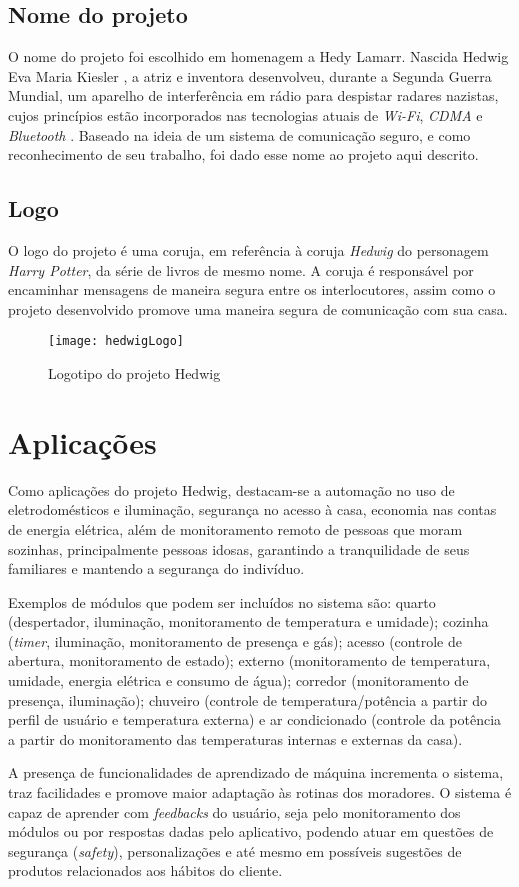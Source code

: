 \subsection{Nome do projeto}
O nome do projeto foi escolhido em homenagem a Hedy Lamarr. Nascida Hedwig Eva Maria Kiesler \cite{shearer}, a atriz e inventora desenvolveu, durante a Segunda Guerra Mundial, um aparelho de interferência em rádio para despistar radares nazistas, cujos princípios estão incorporados nas tecnologias atuais de \emph{Wi-Fi}, \emph{CDMA} e \emph{Bluetooth} \cite{electronicFrontier}. Baseado na ideia de um sistema de comunicação seguro, e como reconhecimento de seu trabalho, foi dado esse nome ao projeto aqui descrito.

\subsection{Logo}
O logo do projeto é uma coruja, em referência à coruja \textit{Hedwig} do personagem \textit{Harry Potter}, da série de livros de mesmo nome. A coruja é responsável por encaminhar mensagens de maneira segura entre os interlocutores, assim como o projeto desenvolvido promove uma maneira segura de comunicação com sua casa.
\begin{figure}[H]
	\centering
	\caption{Logotipo do projeto Hedwig}
  \texttt{[image: hedwigLogo]}
\label{fig:hedwigLogo}
\end{figure}

\section{Aplicações}
Como aplicações do projeto Hedwig, destacam-se a automação no uso de eletrodomésticos e iluminação, segurança no acesso à casa, economia nas contas de energia elétrica, além de  monitoramento remoto de pessoas que moram sozinhas, principalmente pessoas idosas, garantindo a tranquilidade de seus familiares e mantendo a segurança do indivíduo.

Exemplos de módulos que podem ser incluídos no sistema são: quarto (despertador, iluminação, monitoramento de temperatura e umidade); cozinha (\textit{timer}, iluminação, monitoramento de presença e gás); acesso (controle de abertura, monitoramento de estado); externo (monitoramento de temperatura, umidade, energia elétrica e consumo de água); corredor (monitoramento de presença, iluminação); chuveiro (controle de temperatura\slash potência a partir do perfil de usuário e temperatura externa) e ar condicionado (controle da potência a partir do monitoramento das temperaturas internas e externas da casa).

A presença de funcionalidades de aprendizado de máquina incrementa o sistema, traz facilidades e promove maior adaptação às rotinas dos moradores. O sistema é capaz de aprender com \emph{feedbacks} do usuário, seja pelo monitoramento dos módulos ou por respostas dadas pelo aplicativo, podendo atuar em questões de segurança (\emph{safety}), personalizações e até mesmo em possíveis sugestões de produtos relacionados aos hábitos do cliente.
